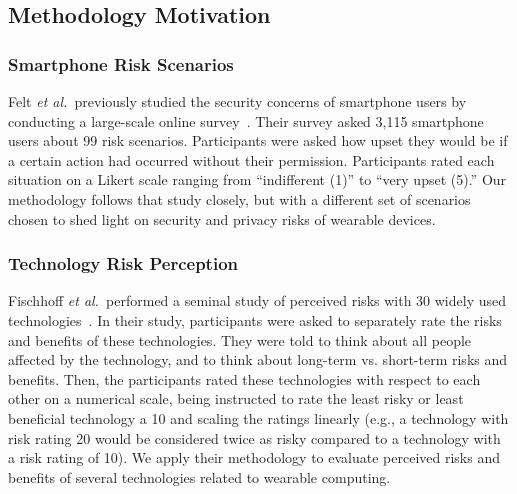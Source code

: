 \documentclass{acm_proc_article-sp}
\def\etal{{\it et al.~}}
\begin{document}


 

\subsection{Methodology Motivation}

\subsubsection{Smartphone Risk Scenarios}
Felt \etal previously studied the security concerns of smartphone users by conducting a large-scale online survey~\cite{Felt}. Their survey asked 3,115 smartphone users about 99 risk scenarios. Participants were asked how upset they would be if a certain action had occurred without their permission. Participants rated each situation on a Likert scale ranging from ``indifferent (1)'' to ``very upset (5).''
Our methodology follows that study closely, but with a different set of scenarios chosen to shed light on security and privacy risks of wearable devices.

\subsubsection{Technology Risk Perception}
Fischhoff \etal performed a seminal study of perceived risks with 30 widely used technologies~\cite{Fischhoff}. In their study, participants were asked to separately rate the risks and benefits of these technologies. They were told to think about all people affected by the technology, and to think about long-term vs. short-term risks and benefits. Then, the participants rated these technologies with respect to each other on a numerical scale, being instructed to rate the least risky or least beneficial technology a 10 and scaling the ratings linearly (e.g., a technology with risk rating 20 would be considered twice as risky compared to a technology with a risk rating of 10).
We apply their methodology to evaluate perceived risks and benefits of several technologies related to wearable computing.
\end{document}
